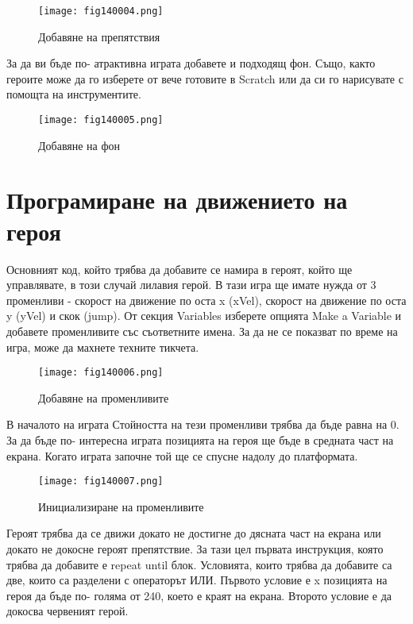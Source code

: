 \begin{figure}[H]
  \centering
  \texttt{[image: fig140004.png]}
  \caption{Добавяне на препятствия}
\label{fig140004}
\end{figure}

За да ви бъде по- атрактивна играта добавете и подходящ фон. Също, както героите може да го изберете от вече готовите в Scratch или да си го нарисувате с помощта на инструментите.

\begin{figure}[H]
  \centering
  \texttt{[image: fig140005.png]}
  \caption{Добавяне на фон}
\label{fig140005}
\end{figure}

\section{Програмиране на движението на героя}

Основният код, който трябва да добавите се намира в героят, който ще управлявате, в този случай лилавия герой. В тази игра ще имате нужда от 3 променливи - скорост на движение по оста x (xVel), скорост на движение по оста y (yVel) и скок (jump). От секция Variables изберете опцията Make a Variable и добавете променливите със съответните имена. За да не се показват по време на игра, може да махнете техните тикчета.

\begin{figure}[H]
  \centering
  \texttt{[image: fig140006.png]}
  \caption{Добавяне на променливите}
\label{fig140006}
\end{figure}

В началото на играта Стойността на тези променливи трябва да бъде равна на 0. За да бъде по- интересна играта позицията на героя ще бъде в средната част на екрана. Когато играта започне той ще се спусне надолу до платформата.

\begin{figure}[H]
  \centering
  \texttt{[image: fig140007.png]}
  \caption{Инициализиране на променливите}
\label{fig140007}
\end{figure}

Героят трябва да се движи докато не достигне до дясната част на екрана или докато не докосне героят препятствие. За тази цел първата инструкция, която трябва да добавите е repeat until блок. Условията, които трябва да добавите са две, които са разделени с операторът ИЛИ. Първото условие е x позицията на героя да бъде по- голяма от 240, което е краят на екрана. Второто условие е да докосва червеният герой.

